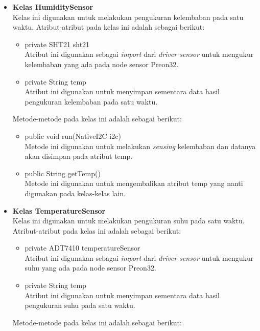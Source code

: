 \begin{itemize}
\begin{itemize}
\begin{itemize}
        \end{itemize}
        \item \textbf{Kelas HumiditySensor}\\
        Kelas ini digunakan untuk melakukan pengukuran kelembaban pada satu waktu. Atribut-atribut pada kelas ini adalah sebagai berikut:
        \begin{itemize}
            \item private SHT21 sht21\\
            Atribut ini digunakan sebagai \textit{import} dari \textit{driver sensor} untuk mengukur kelembaban yang ada pada node sensor Preon32.
            \item private String temp\\
            Atribut ini digunakan untuk menyimpan sementara data hasil pengukuran kelembaban pada satu waktu.
        \end{itemize}
        Metode-metode pada kelas ini adalah sebagai berikut:
        \begin{itemize}
            \item public void run(NativeI2C i2c)\\
            Metode ini digunakan untuk melakukan \textit{sensing} kelembaban dan datanya akan disimpan pada atribut temp.
            \item public String getTemp()\\
            Metode ini digunakan untuk mengembalikan atribut temp yang nanti digunakan pada kelas-kelas lain.
        \end{itemize}
        \item \textbf{Kelas TemperatureSensor}\\
        Kelas ini digunakan untuk melakukan pengukuran suhu pada satu waktu. Atribut-atribut pada kelas ini adalah sebagai berikut:
        \begin{itemize}
            \item private ADT7410 temperatureSensor\\
            Atribut ini digunakan sebagai \textit{import} dari \textit{driver sensor} untuk mengukur suhu yang ada pada node sensor Preon32.
            \item private String temp\\
            Atribut ini digunakan untuk menyimpan sementara data hasil pengukuran suhu pada satu waktu.
        \end{itemize}
        Metode-metode pada kelas ini adalah sebagai berikut:
        \begin{itemize}

\end{itemize}
\end{itemize}
\end{itemize}
